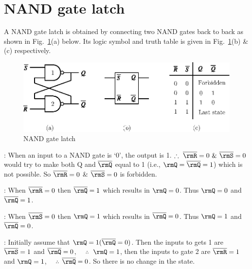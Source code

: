 \section{NAND gate latch}\label{sec6.2}
A NAND gate latch is obtained by connecting two NAND gates back to
back as shown in Fig.~\ref{fig6.2}(a) below. Its logic symbol and
truth table is given in Fig.~\ref{fig6.2}(b) \& (c) respectively.
\begin{figure}[H]
\centering
\includegraphics[scale=1.05]{chap6/fig6.2.eps}
\caption{NAND gate latch}\label{fig6.2}
\end{figure}

 : When
an input to a NAND gate is `0', the output is 1. $\therefore ~ \overline{\rmR}
= 0 ~\&~ \overline{\rmS} = 0$ would try to make both Q and $\overline{\rmQ}$ equal
to 1 (i.e., $\rmQ=\overline{\rmQ} =1$) which is not possible. So $\overline{\rmR} =
0$ \& $\overline{\rmS}=0$ is forbidden.

 : When
$\overline{\rmR} =0$ then $\overline{\rmQ} =1$ which results in $\rmQ=0$. Thus $\rmQ=0$ and
$\overline{\rmQ} =1$.

 : When
$\overline{\rmS}=0$ then $\rmQ = 1$ which results in $\overline{\rmQ} =0$. Thus $\rmQ=1$
and $\overline{\rmQ}=0$.

 : Initially
assume that $\rmQ=1 (\overline{\rmQ}=0)$. Then the inputs to gets 1 are
$\overline{\rmS}=1$ and $\overline{\rmQ}=0$, ~~$\therefore ~$ $\rmQ =1$, then the inputs to
gate 2 are $\overline{\rmR}=1$ and $\rmQ =1$, ~~$\therefore$ $\overline{\rmQ} =0$. So there
is no change in the state.

